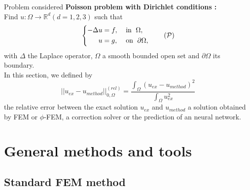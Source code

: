 \documentclass[compress,10pt,xcolor={table,dvipsnames},t]{beamer}
\begin{document}
	\begin{frame}{Problem considered}
		\textbf{Poisson problem with Dirichlet conditions :} \\
		Find $u : \Omega \rightarrow \mathbb{R}^d (d=1,2,3)$ such that
		\begin{equation}
			\left\{
			\begin{aligned}
				-\Delta u &= f, \; &&\text{in } \; \Omega, \\
				u&=g, \; &&\text{on } \; \partial\Omega,
			\end{aligned}
			\right. \tag{$\mathcal{P}$} \label{pb_initial}
		\end{equation}
		with $\Delta$ the Laplace operator, $\Omega$ a smooth bounded open set and $\partial\Omega$ its boundary. \\
		In this section, we defined by
		\begin{equation*}
			||u_{ex}-u_{method}||_{0,\Omega}^{(rel)}=\frac{\int_\Omega (u_{ex}-u_{method})^2}{\int_\Omega u_{ex}^2}
		\end{equation*}
		the relative error between the exact solution $u_{ex}$ and $u_{method}$ a solution obtained by FEM or $\phi$-FEM, a correction solver or the prediction of an neural network.
		
	\end{frame}

	\section{General methods and tools}
	
	\subsection{Standard FEM method}
	
\end{document}
